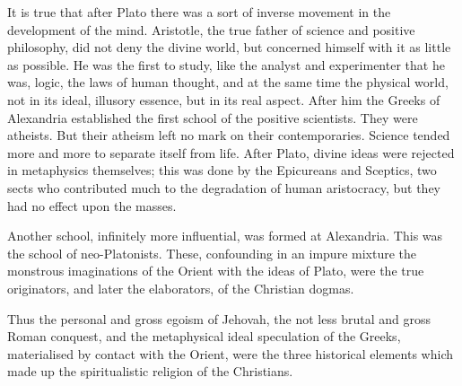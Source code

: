 \documentclass[12pt]{report}
\begin{document}
It is true that after Plato there was a sort of inverse movement in the development of the mind. Aristotle, the true father of science and positive philosophy, did not deny the divine world, but concerned himself with it as little as possible. He was the first to study, like the analyst and experimenter that he was, logic, the laws of human thought, and at the same time the physical world, not in its ideal, illusory essence, but in its real aspect. After him the Greeks of Alexandria established the first school of the positive scientists. They were atheists. But their atheism left no mark on their contemporaries. Science tended more and more to separate itself from life. After Plato, divine ideas were rejected in metaphysics themselves; this was done by the Epicureans and Sceptics, two sects who contributed much to the degradation of human aristocracy, but they had no effect upon the masses.


Another school, infinitely more influential, was formed at Alexandria. This was the school of neo-Platonists. These, confounding in an impure mixture the monstrous imaginations of the Orient with the ideas of Plato, were the true originators, and later the elaborators, of the Christian dogmas.


Thus the personal and gross egoism of Jehovah, the not less brutal and gross Roman conquest, and the metaphysical ideal speculation of the Greeks, materialised by contact with the Orient, were the three historical elements which made up the spiritualistic religion of the Christians.
\end{document}
